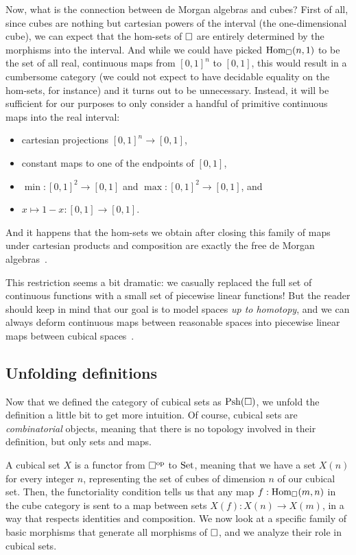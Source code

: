 Now, what is the connection between de Morgan algebras and cubes? First of all,
since cubes are nothing but cartesian powers of the interval (the 
one-dimensional cube), we can expect that the hom-sets of \( \catCube \) are 
entirely determined by the morphisms into the interval. 
% 
And while we could have picked \( \hom[\catCube]{n}{1} \) to be the set 
of all real, continuous maps from \( [0, 1]^n \) to \( [0, 1] \), this would result in a 
cumbersome category (we could not expect to have decidable equality on the hom-sets, 
for instance) and it turns out to be unnecessary.
% 
Instead, it will be sufficient for our purposes to only consider a handful of 
primitive continuous maps into the real interval:
\begin{itemize}
    \item cartesian projections \( [0, 1]^n \to [0, 1] \),
    \item constant maps to one of the endpoints of \( [0, 1] \),
    \item \( \min : [0, 1]^2 \to [0, 1] \) and \( \max : [0, 1]^2 \to [0, 1] \), and
    \item \( x \mapsto 1 - x : [0, 1] \to [0, 1] \).
\end{itemize}
% 
And it happens that the hom-sets we obtain after closing this family of
maps under cartesian products and composition are exactly the free de 
Morgan algebras~.

This restriction seems a bit dramatic: we casually replaced the full set of 
continuous functions with a small set of piecewise linear functions! But the reader
should keep in mind that our goal is to model spaces \emph{up to homotopy},
and we can always deform continuous maps between reasonable spaces into 
piecewise linear maps between cubical spaces~.

\subsection{Unfolding definitions}

Now that we defined the category of cubical sets as \( \catPsh{\catCube} \), we
unfold the definition a little bit to get more intuition.
% 
Of course, cubical sets are \emph{combinatorial} objects, meaning that there is 
no topology involved in their definition, but only sets and maps.

A cubical set \( X \) is a functor from \( \op{\catCube} \) to \( \catSet \), 
meaning that we have a set \( X(n) \) for every integer \( n \), representing 
the set of cubes of dimension \( n \) of our cubical set.
% 
Then, the functoriality condition tells us that any map 
\( f : \hom[\catCube]{m}{n} \) in the cube category is sent to a map between 
sets \( X(f) : X(n) \to X(m) \), in a way that respects identities and 
composition. 
% 
We now look at a specific family of basic morphisms that generate all 
morphisms of \( \catCube \), and we analyze their role in cubical sets.
% 
